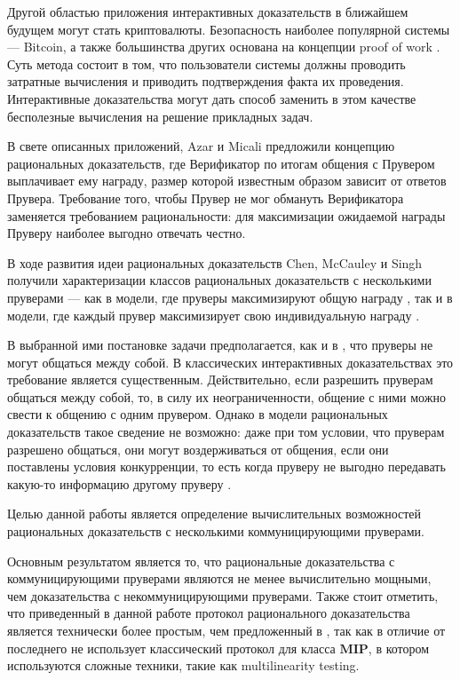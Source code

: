 \documentclass{mipt-thesis-bs}
\theoremstyle{plain}
\theoremstyle{definition}
\begin{document}
Другой областью приложения интерактивных доказательств в ближайшем будущем могут стать криптовалюты. Безопасность наиболее популярной системы --- Bitcoin, а также большинства других основана на концепции proof of work \cite{nakamoto2008bitcoin}. Суть метода состоит в том, что пользователи системы должны проводить затратные вычисления и приводить подтверждения факта их проведения. Интерактивные доказательства могут дать способ заменить в этом качестве бесполезные вычисления на решение прикладных задач.

В свете описанных приложений, Azar и Micali \cite{azar2012rational} предложили концепцию рациональных доказательств, где Верификатор по итогам общения с Прувером выплачивает ему награду, размер которой известным образом зависит от ответов Прувера. Требование того, чтобы Прувер не мог обмануть Верификатора заменяется требованием рациональности: для максимизации ожидаемой награды Пруверу наиболее выгодно отвечать честно.

В ходе развития идеи рациональных доказательств Chen, McCauley и Singh получили характеризации классов рациональных доказательств с несколькими пруверами --- как в модели, где пруверы максимизируют общую награду \cite{chen2016mrip}, так и в модели, где каждый прувер максимизирует свою индивидуальную награду \cite{chen2017noncoop}.

В выбранной ими постановке задачи предполагается, как и в \cite{babai1991mip}, что пруверы не могут общаться между собой. В классических интерактивных доказательствах это требование является существенным. Действительно, если разрешить пруверам общаться между собой, то, в силу их неограниченности, общение с ними можно свести к общению с одним прувером. Однако в модели рациональных доказательств такое сведение не возможно: даже при том условии, что пруверам разрешено общаться, они могут воздерживаться от общения, если они поставлены условия конкурренции, то есть когда пруверу не выгодно передавать какую-то информацию другому пруверу .

Целью данной работы является определение вычислительных возможностей рациональных доказательств с несколькими коммуницирующими пруверами.

Основным результатом является то, что рациональные доказательства с коммуницирующими пруверами являются не менее вычислительно мощными, чем доказательства с некоммуницирующими пруверами. Также стоит отметить, что приведенный в данной работе протокол рационального доказательства является технически более простым, чем предложенный в \cite{chen2017noncoop}, так как в отличие от последнего не использует классический протокол для класса $\textbf{MIP}$, в котором используются сложные техники, такие как multilinearity testing.
\end{document}
